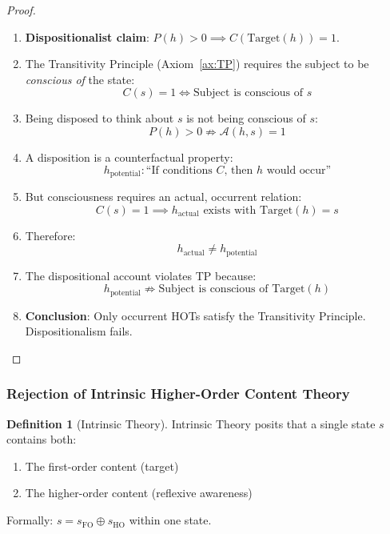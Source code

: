 \documentclass[11pt,a4paper]{article}
\theoremstyle{definition}
\newtheorem{definition}{Definition}[section]
\theoremstyle{remark}
\newcommand{\A}{\mathcal{A}}
\newcommand{\Target}{\text{Target}}
\begin{document}
\begin{proof}
\begin{enumerate}
    \item \textbf{Dispositionalist claim}: $P(h) > 0 \implies C(\Target(h)) = 1$.
    \item The Transitivity Principle (Axiom~\ref{ax:TP}) requires the subject to be \textit{conscious of} the state:
    \begin{equation}
    C(s) = 1 \iff \text{Subject is conscious of } s
    \end{equation}
    \item Being disposed to think about $s$ is not being conscious of $s$:
    \begin{equation}
    P(h) > 0 \not\Rightarrow \A(h, s) = 1
    \end{equation}
    \item A disposition is a counterfactual property:
    \begin{equation}
    h_{\text{potential}} : \text{``If conditions } C \text{, then } h \text{ would occur''}
    \end{equation}
    \item But consciousness requires an actual, occurrent relation:
    \begin{equation}
    C(s) = 1 \implies h_{\text{actual}} \text{ exists with } \Target(h) = s
    \end{equation}
    \item Therefore:
    \begin{equation}
    \boxed{h_{\text{actual}} \neq h_{\text{potential}}}
    \end{equation}
    \item The dispositional account violates TP because:
    \begin{equation}
    h_{\text{potential}} \not\Rightarrow \text{Subject is conscious of } \Target(h)
    \end{equation}
    \item \textbf{Conclusion}: Only occurrent HOTs satisfy the Transitivity Principle. Dispositionalism fails. \qedhere
\end{enumerate}
\end{proof}

\subsubsection{Rejection of Intrinsic Higher-Order Content Theory}

\begin{definition}[Intrinsic Theory]
\label{def:intrinsic}
Intrinsic Theory posits that a single state $s$ contains both:
\begin{enumerate}
    \item The first-order content (target)
    \item The higher-order content (reflexive awareness)
\end{enumerate}
Formally: $s = s_{\text{FO}} \oplus s_{\text{HO}}$ within one state.
\end{definition}
\end{document}
